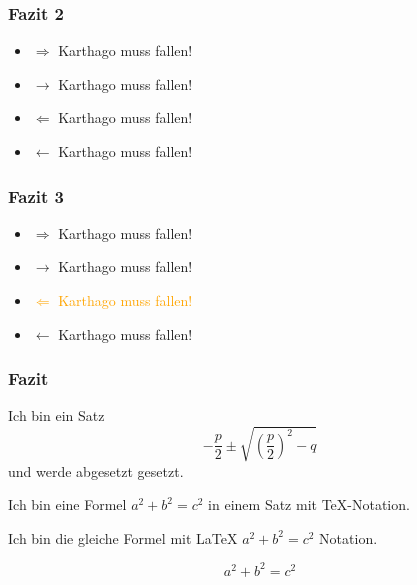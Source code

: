 \documentclass[ngerman]{beamer}
\begin{document}
\begin{frame}
	\frametitle{Fazit 2}
	
\begin{itemize}
	\item<1->  $\Rightarrow$ Karthago muss fallen! 
	\item<-2>  $\rightarrow$ Karthago muss fallen!	
	\item<3->  $\Leftarrow$ Karthago muss fallen! 
	\item<4->  $\leftarrow$ Karthago muss fallen!	
\end{itemize}	

\end{frame}

\begin{frame}
	\frametitle{Fazit 3}
	
\begin{itemize}
	\item<-2,4>  $\Rightarrow$ Karthago muss fallen! 
	\item<3->  $\rightarrow$ Karthago muss fallen!	
	\item<1->  \textcolor<2->{orange}{$\Leftarrow$ Karthago muss fallen!} 
	\item<4->  $\leftarrow$ Karthago muss fallen!	
\end{itemize}	

\end{frame}

\begin{frame}
	\frametitle{Fazit}
	
	
Ich bin ein Satz	
\begin{equation}
-\frac{p}{2} \pm \sqrt{   \left(\frac{p}{2}\right)^2  - q   }
\end{equation} und werde abgesetzt gesetzt.

Ich bin eine Formel $a^2+b^2=c^2$ in einem Satz mit TeX-Notation.

Ich bin die gleiche Formel mit LaTeX \( a^2 + b^2 = c^2 \) Notation.

\[  a^2 + b^2 = c^2 \]


	
\end{frame}


	
\end{document}
